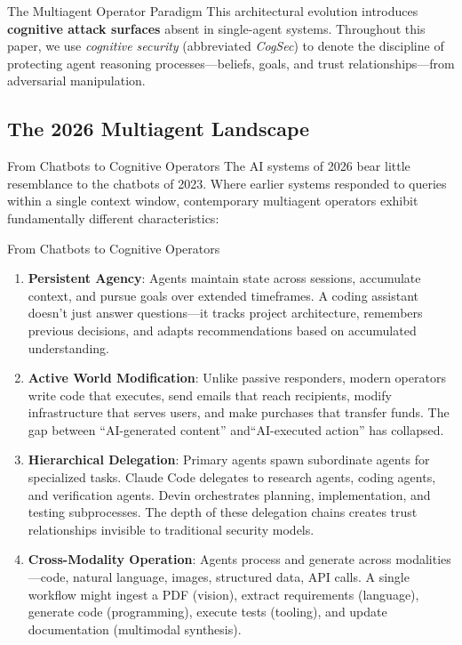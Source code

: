 \documentclass[
  ignorenonframetext,
]{beamer}
\begin{document}
\begin{frame}[allowframebreaks]{The Multiagent Operator Paradigm}
This architectural evolution introduces \textbf{cognitive attack
surfaces} absent in single-agent systems. Throughout this paper, we use
\emph{cognitive security} (abbreviated \emph{CogSec}) to denote the
discipline of protecting agent reasoning processes---beliefs, goals, and
trust relationships---from adversarial manipulation.
\end{frame}

\subsection{The 2026 Multiagent Landscape}\label{sec:landscape}

\begin{frame}[allowframebreaks]{From Chatbots to Cognitive Operators}
\protect{}\label{from-chatbots-to-cognitive-operators}
The AI systems of 2026 bear little resemblance to the chatbots of 2023.
Where earlier systems responded to queries within a single context
window, contemporary multiagent operators exhibit fundamentally
different characteristics:

\end{frame}

\begin{frame}[allowframebreaks]{From Chatbots to Cognitive Operators}
\begin{enumerate}
\item \textbf{Persistent Agency}: Agents maintain state across sessions, accumulate context, and pursue goals over extended timeframes. A coding assistant doesn't just answer questions---it tracks project architecture, remembers previous decisions, and adapts recommendations based on accumulated understanding.

\item \textbf{Active World Modification}: Unlike passive responders, modern operators write code that executes, send emails that reach recipients, modify infrastructure that serves users, and make purchases that transfer funds. The gap between ``AI-generated content'' and``AI-executed action'' has collapsed.

\item \textbf{Hierarchical Delegation}: Primary agents spawn subordinate agents for specialized tasks. Claude Code delegates to research agents, coding agents, and verification agents. Devin orchestrates planning, implementation, and testing subprocesses. The depth of these delegation chains creates trust relationships invisible to traditional security models.

\item \textbf{Cross-Modality Operation}: Agents process and generate across modalities---code, natural language, images, structured data, API calls. A single workflow might ingest a PDF (vision), extract requirements (language), generate code (programming), execute tests (tooling), and update documentation (multimodal synthesis).
\end{enumerate}
\end{frame}
\end{document}
